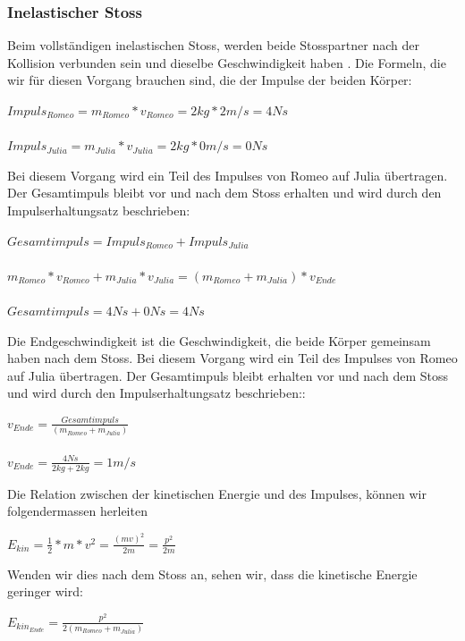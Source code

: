 \documentclass[../main.tex]{subfiles}
\begin{document}
\subsubsection{Inelastischer Stoss}
Beim vollständigen inelastischen Stoss, werden beide Stosspartner nach der Kollision verbunden sein und dieselbe
Geschwindigkeit haben \cite{tiplerpaula.PhysikFurStudierende}. Die Formeln, die wir für diesen Vorgang brauchen sind,
die der Impulse der beiden Körper:
\begin{mdframed}
$Impuls_{Romeo} = m_{Romeo}*v_{Romeo} = 2kg * 2m/s = 4 Ns$\\\\
$Impuls_{Julia} = m_{Julia}*v_{Julia} = 2kg * 0m/s = 0Ns$
\end{mdframed}
 Bei diesem Vorgang wird ein Teil des Impulses von Romeo auf Julia übertragen. Der Gesamtimpuls bleibt vor
 und nach dem Stoss erhalten und wird durch den Impulserhaltungsatz beschrieben:%
\begin{mdframed}
$Gesamtimpuls = Impuls_{Romeo} + Impuls_{Julia}$
\\\\$m_{Romeo}*v_{Romeo} +  m_{Julia}*v_{Julia} = (m_{Romeo} + m_{Julia})*v_{Ende}$\\\\
$Gesamtimpuls = 4Ns + 0Ns = 4Ns$
\end{mdframed}
Die Endgeschwindigkeit ist die Geschwindigkeit, die beide Körper gemeinsam haben nach dem Stoss.
 Bei diesem Vorgang wird ein Teil des Impulses von Romeo auf Julia übertragen. Der Gesamtimpuls bleibt erhalten vor
 und nach dem Stoss und wird durch den Impulserhaltungsatz beschrieben:\cite{tiplerpaula.PhysikFurStudierende}:
\begin{mdframed}
$v_{Ende} = \frac{Gesamtimpuls}{(m_{Romeo} + m_{Julia})}$\\\\
$v_{Ende} = \frac{4Ns}{2kg + 2kg} = 1m/s$
\end{mdframed}

Die Relation zwischen der kinetischen Energie und des Impulses, können wir folgendermassen
herleiten %
\begin{mdframed}
$E_{kin}=\frac{1}{2} * m * v^{2} = \frac{(mv)^{2}}{2m} = \frac{p^{2}}{2m}$
\end{mdframed}
Wenden wir dies nach dem Stoss an, sehen wir, dass die kinetische Energie geringer wird:
\begin{mdframed}
$E_{kin_{Ende}}=\frac{p^{2}}{2(m_{Romeo} + m_{Julia})} $
\end{mdframed}
\end{document}

